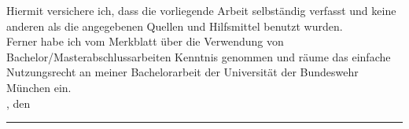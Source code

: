 \clearpage
{}


Hiermit versichere ich, dass die vorliegende Arbeit selbständig verfasst und keine anderen als die angegebenen Quellen und Hilfsmittel benutzt wurden.\\Ferner habe ich vom Merkblatt über die Verwendung von Bachelor/Masterabschlussarbeiten Kenntnis genommen und räume das einfache Nutzungsrecht an meiner Bachelorarbeit der Universität der Bundeswehr München ein.\\[6ex]

\abgabeOrt, den \abgabeTermin


\rule[-0.2cm]{5.5cm}{0.5pt}

\textsc{\autorName}
